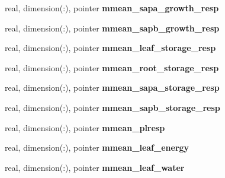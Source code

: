 \begin{DoxyCompactItemize}
\item 
\hypertarget{structed__state__vars_1_1edtype_aaf2bfbd250a49488bc94686c35f0ca07}{
real, dimension(:), pointer {\bfseries mmean\_\-sapa\_\-growth\_\-resp}}
\label{structed__state__vars_1_1edtype_aaf2bfbd250a49488bc94686c35f0ca07}

\item 
\hypertarget{structed__state__vars_1_1edtype_a6b392b8541419fcb4c4eb2136fcdaaea}{
real, dimension(:), pointer {\bfseries mmean\_\-sapb\_\-growth\_\-resp}}
\label{structed__state__vars_1_1edtype_a6b392b8541419fcb4c4eb2136fcdaaea}

\item 
\hypertarget{structed__state__vars_1_1edtype_ad205e5cc8eadc35ebea23a7622e7983e}{
real, dimension(:), pointer {\bfseries mmean\_\-leaf\_\-storage\_\-resp}}
\label{structed__state__vars_1_1edtype_ad205e5cc8eadc35ebea23a7622e7983e}

\item 
\hypertarget{structed__state__vars_1_1edtype_a699bd39b046cfef1884dffd2d3fa0b48}{
real, dimension(:), pointer {\bfseries mmean\_\-root\_\-storage\_\-resp}}
\label{structed__state__vars_1_1edtype_a699bd39b046cfef1884dffd2d3fa0b48}

\item 
\hypertarget{structed__state__vars_1_1edtype_afd6482e68523e4c184aea7f290bb72b0}{
real, dimension(:), pointer {\bfseries mmean\_\-sapa\_\-storage\_\-resp}}
\label{structed__state__vars_1_1edtype_afd6482e68523e4c184aea7f290bb72b0}

\item 
\hypertarget{structed__state__vars_1_1edtype_ab4d86be15ad1c8b1577374bcccbf5ffa}{
real, dimension(:), pointer {\bfseries mmean\_\-sapb\_\-storage\_\-resp}}
\label{structed__state__vars_1_1edtype_ab4d86be15ad1c8b1577374bcccbf5ffa}

\item 
\hypertarget{structed__state__vars_1_1edtype_a3cca83cb88a2a724163428254cd04697}{
real, dimension(:), pointer {\bfseries mmean\_\-plresp}}
\label{structed__state__vars_1_1edtype_a3cca83cb88a2a724163428254cd04697}

\item 
\hypertarget{structed__state__vars_1_1edtype_a41ac7eac798d111ebbbe043c543aba8b}{
real, dimension(:), pointer {\bfseries mmean\_\-leaf\_\-energy}}
\label{structed__state__vars_1_1edtype_a41ac7eac798d111ebbbe043c543aba8b}

\item 
\hypertarget{structed__state__vars_1_1edtype_a70be05d4fac1347af68a9a00a913b0a0}{
real, dimension(:), pointer {\bfseries mmean\_\-leaf\_\-water}}
\label{structed__state__vars_1_1edtype_a70be05d4fac1347af68a9a00a913b0a0}


\end{DoxyCompactItemize}
